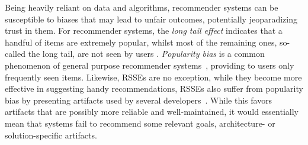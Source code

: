 

Being heavily reliant on data and algorithms, recommender systems can be susceptible to biases that may lead to unfair outcomes, potentially jeoparadizing trust in them. %
For recommender systems, %
the \emph{long tail effect} indicates that a handful of items are extremely popular, whilst most of the remaining ones, so-called the long tail, are not seen by users \cite{Anderson:2006:LTW:1197299}. %
\emph{Popularity bias} is a common phenomenon of general purpose recommender systems~\cite{DBLP:conf/flairs/AbdollahpouriBM19,DBLP:conf/recsys/AbdollahpouriMB19,10.1145/3564284}, \ie providing to users only frequently seen items. Likewise, RSSEs are no exception, while they become more effective in suggesting handy recommendations, RSSEs also suffer from popularity bias by presenting artifacts %
used by several developers~\cite{10174041}. While this favors artifacts that are possibly more reliable and well-maintained, it would essentially mean that systems fail to recommend some relevant goals, architecture- or solution-specific artifacts. %






